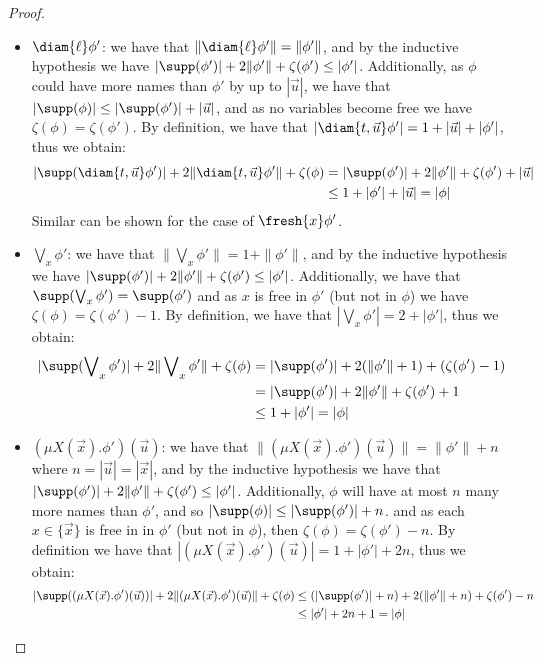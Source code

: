 \begin{proof}
\begin{itemize}
\[		\]
		\item $\diam{\ell} \phi'$: 
		we have that $\|\diam{\ell}\phi'\| = \|\phi'\|$, and by the inductive hypothesis we have $|\supp(\phi')| + 2\|\phi'\| + \zeta(\phi') \le |\phi'|$. 
		Additionally, as $\phi$ could have more names than $\phi'$ by up to $|\vec u|$, we have that $|\supp(\phi)| \le |\supp(\phi')| + |\vec u|$, and as no variables become free we have $\zeta(\phi) = \zeta(\phi')$.
		By definition, we have that $|\diam{t, \vec u} \phi'| = 1 + |\vec u| + |\phi'|$, thus we obtain:
		\begin{align*}
			|\supp(\diam{t, \vec u} \phi')| + 2\|\diam{t, \vec u} \phi'\| + \zeta(\phi) 
			&= |\supp(\phi')| + 2\|\phi'\| + \zeta(\phi') + |\vec u|\\
			&\le 1 + |\phi'| + |\vec u| = |\phi|
		\end{align*}
		Similar can be shown for the case of $\fresh{x}\phi'$.
		\item $\bigvee\nolimits_x \phi'$: we have that $\|\bigvee\nolimits_x \phi'\| = 1 + \|\phi'\|$, and by the inductive hypothesis we have $|\supp(\phi')| + 2\|\phi'\| + \zeta(\phi') \le |\phi'|$.
		Additionally, we have that $\supp(\bigvee\nolimits_x \phi') = \supp(\phi')$ and as $x$ is free in $\phi'$ (but not in $\phi$) we have $\zeta(\phi) = \zeta(\phi') - 1$.
		By definition, we have that $|\bigvee\nolimits_x \phi'| = 2 + |\phi'|$, thus we obtain:
		\begin{align*}
			|\supp(\bigvee\nolimits_x \phi')| + 2\|\bigvee\nolimits_x  \phi'\| + \zeta(\phi) &= |\supp(\phi')| + 2(\|\phi'\| + 1) + (\zeta(\phi') - 1)\\
			&= |\supp(\phi')| + 2\|\phi'\| + \zeta(\phi') + 1\\
			&\le 1 + |\phi'| = |\phi|  
		\end{align*}
		\item $(\mu X(\vec x).\phi')(\vec u)$: we have that $\|(\mu X(\vec x).\phi')(\vec u)\| = \|\phi'\| + n$ where $n = |\vec u| = |\vec x|$, and by the inductive hypothesis we have that $|\supp(\phi')| + 2\|\phi'\| + \zeta(\phi') \le |\phi'|$. 
		Additionally, $\phi$ will have at most $n$ many more names than $\phi'$, and so $|\supp(\phi)| \le |\supp(\phi')| + n$. 
		and as each $x \in \{\vec x\}$ is free in in $\phi'$ (but not in $\phi$), then $\zeta(\phi) = \zeta(\phi') - n$.
		By definition we have that $|(\mu X(\vec x).\phi')(\vec u)| = 1 + |\phi'| + 2n$, thus we obtain:
		\begin{align*}
			|\supp((\mu X(\vec x).\phi')(\vec u))| + 2\|(\mu X(\vec x).\phi')(\vec u)\| + \zeta(\phi)
			&\le (|\supp(\phi')| + n) + 2(\|\phi'\| + n) + \zeta(\phi') - n\\
			&\le |\phi'| + 2n + 1 = |\phi|\ 
		\end{align*}
	\end{itemize}
\end{proof}


